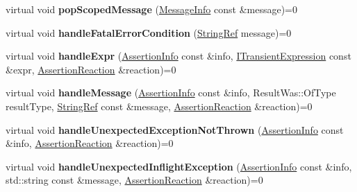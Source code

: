 \begin{DoxyCompactItemize}
\item 
\mbox{\label{struct_catch_1_1_i_result_capture_a42bcb13276706bf8c3ce081ce16d37fd}} 
virtual void {\bfseries pop\+Scoped\+Message} (\mbox{\hyperlink{struct_catch_1_1_message_info}{Message\+Info}} const \&message)=0
\item 
\mbox{\label{struct_catch_1_1_i_result_capture_a48559e6598ba9474b903697b69c769b2}} 
virtual void {\bfseries handle\+Fatal\+Error\+Condition} (\mbox{\hyperlink{class_catch_1_1_string_ref}{String\+Ref}} message)=0
\item 
\mbox{\label{struct_catch_1_1_i_result_capture_a59a2b05391e464954575d2afb6d5d607}} 
virtual void {\bfseries handle\+Expr} (\mbox{\hyperlink{struct_catch_1_1_assertion_info}{Assertion\+Info}} const \&info, \mbox{\hyperlink{struct_catch_1_1_i_transient_expression}{I\+Transient\+Expression}} const \&expr, \mbox{\hyperlink{struct_catch_1_1_assertion_reaction}{Assertion\+Reaction}} \&reaction)=0
\item 
\mbox{\label{struct_catch_1_1_i_result_capture_a21788ebc64571abf322b80c8cc51794d}} 
virtual void {\bfseries handle\+Message} (\mbox{\hyperlink{struct_catch_1_1_assertion_info}{Assertion\+Info}} const \&info, Result\+Was\+::\+Of\+Type result\+Type, \mbox{\hyperlink{class_catch_1_1_string_ref}{String\+Ref}} const \&message, \mbox{\hyperlink{struct_catch_1_1_assertion_reaction}{Assertion\+Reaction}} \&reaction)=0
\item 
\mbox{\label{struct_catch_1_1_i_result_capture_a6382ed20486e2d9a020da971c6d5c53d}} 
virtual void {\bfseries handle\+Unexpected\+Exception\+Not\+Thrown} (\mbox{\hyperlink{struct_catch_1_1_assertion_info}{Assertion\+Info}} const \&info, \mbox{\hyperlink{struct_catch_1_1_assertion_reaction}{Assertion\+Reaction}} \&reaction)=0
\item 
\mbox{\label{struct_catch_1_1_i_result_capture_afc97bc69829185222f955ebeef97adfe}} 
virtual void {\bfseries handle\+Unexpected\+Inflight\+Exception} (\mbox{\hyperlink{struct_catch_1_1_assertion_info}{Assertion\+Info}} const \&info, std\+::string const \&message, \mbox{\hyperlink{struct_catch_1_1_assertion_reaction}{Assertion\+Reaction}} \&reaction)=0

\end{DoxyCompactItemize}

